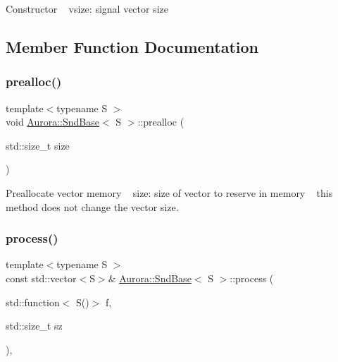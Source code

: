 Constructor ~\newline
vsize\+: signal vector size 

\subsection{Member Function Documentation}
\mbox{\label{class_aurora_1_1_snd_base_a5d57c3b735e5d583b4b4ae5f8e9cdf4c}} 
\subsubsection{\texorpdfstring{prealloc()}{prealloc()}}
{\footnotesize\ttfamily template$<$typename S $>$ \\
void \hyperlink{class_aurora_1_1_snd_base}{Aurora\+::\+Snd\+Base}$<$ S $>$\+::prealloc (\begin{DoxyParamCaption}\item[{std\+::size\+\_\+t}]{size }\end{DoxyParamCaption})\hspace{0.3cm}{\ttfamily [inline]}}

Preallocate vector memory ~\newline
size\+: size of vector to reserve in memory ~\newline
this method does not change the vector size. \mbox{\label{class_aurora_1_1_snd_base_a1601dc3f75fac1979d028bb7477d2544}} 
\subsubsection{\texorpdfstring{process()}{process()}}
{\footnotesize\ttfamily template$<$typename S $>$ \\
const std\+::vector$<$S$>$\& \hyperlink{class_aurora_1_1_snd_base}{Aurora\+::\+Snd\+Base}$<$ S $>$\+::process (\begin{DoxyParamCaption}\item[{std\+::function$<$ S()$>$}]{f,  }\item[{std\+::size\+\_\+t}]{sz }\end{DoxyParamCaption})\hspace{0.3cm}{\ttfamily [inline]}, {\ttfamily [protected]}}

